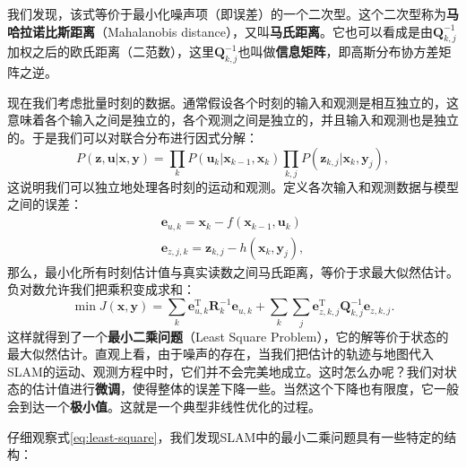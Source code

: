 我们发现，该式等价于最小化噪声项（即误差）的一个二次型。这个二次型称为\textbf{马哈拉诺比斯距离}（Mahalanobis distance），又叫\textbf{马氏距离}。它也可以看成是由$\bm{Q}_{k,j}^{-1}$加权之后的欧氏距离（二范数），这里$\bm{Q}_{k,j}^{-1}$也叫做\textbf{信息矩阵}，即高斯分布协方差矩阵之逆。

现在我们考虑批量时刻的数据。通常假设各个时刻的输入和观测是相互独立的，这意味着各个输入之间是独立的，各个观测之间是独立的，并且输入和观测也是独立的。于是我们可以对联合分布进行因式分解：
\begin{equation}
P\left( {\bm{z},\bm{u}|\bm{x},\bm{y}} \right) = \prod\limits_k {P\left( {{\bm{u}_k}|{\bm{x}_{k - 1}},{\bm{x}_k}} \right)} \prod\limits_{k,j} {P\left( {{\bm{z}_{k,j}}|{\bm{x}_k},{\bm{y}_j}} \right)},	
\end{equation}
这说明我们可以独立地处理各时刻的运动和观测。定义各次输入和观测数据与模型之间的误差：
\begin{equation}
\begin{array}{l}
{\bm{e}_{u,k}} = {\bm{x}_k} - f\left( {{\bm{x}_{k - 1}},{\bm{u}_k}} \right)\\
{\bm{e}_{z,j,k}} = {\bm{z}_{k,j}} - h\left( {{\bm{x}_k},{\bm{y}_j}} \right),
\end{array}
\end{equation}
那么，最小化所有时刻估计值与真实读数之间马氏距离，等价于求最大似然估计。负对数允许我们把乘积变成求和：
\begin{equation}
\label{eq:least-square}
\min J (\bm{x},\bm{y}) = \sum\limits_k {\bm{e}_{u,k}^\mathrm{T} \bm{R}_k^{ - 1}{ \bm{e}_{u,k}}}  + \sum\limits_k {\sum\limits_j {\bm{e}_{z,k,j}^\mathrm{T} \bm{Q}_{k,j}^{ - 1}{\bm{e}_{z,k,j}}} } .
\end{equation}
这样就得到了一个\textbf{最小二乘问题}（Least Square Problem），它的解等价于状态的最大似然估计。直观上看，由于噪声的存在，当我们把估计的轨迹与地图代入SLAM的运动、观测方程中时，它们并不会完美地成立。这时怎么办呢？我们对状态的估计值进行\textbf{微调}，使得整体的误差下降一些。当然这个下降也有限度，它一般会到达一个\textbf{极小值}。这就是一个典型非线性优化的过程。

仔细观察式\eqref{eq:least-square}，我们发现SLAM中的最小二乘问题具有一些特定的结构：

